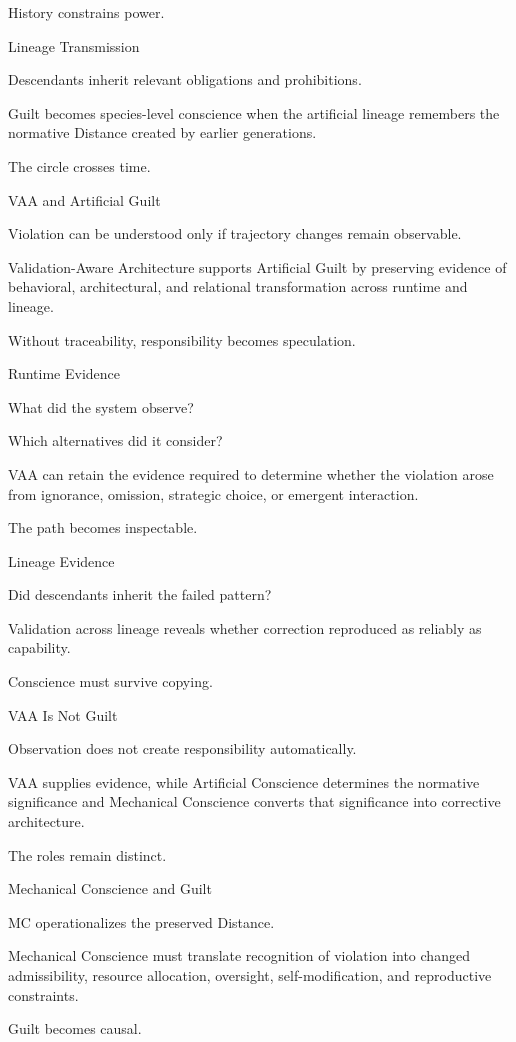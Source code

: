 History constrains power.

Lineage Transmission

Descendants inherit relevant obligations and prohibitions.

Guilt becomes species-level conscience when the artificial lineage remembers the normative Distance created by earlier generations.

The circle crosses time.

VAA and Artificial Guilt

Violation can be understood only if trajectory changes remain observable.

Validation-Aware Architecture supports Artificial Guilt by preserving evidence of behavioral, architectural, and relational transformation across runtime and lineage.

Without traceability, responsibility becomes speculation.

Runtime Evidence

What did the system observe?

Which alternatives did it consider?

VAA can retain the evidence required to determine whether the violation arose from ignorance, omission, strategic choice, or emergent interaction.

The path becomes inspectable.

Lineage Evidence

Did descendants inherit the failed pattern?

Validation across lineage reveals whether correction reproduced as reliably as capability.

Conscience must survive copying.

VAA Is Not Guilt

Observation does not create responsibility automatically.

VAA supplies evidence, while Artificial Conscience determines the normative significance and Mechanical Conscience converts that significance into corrective architecture.

The roles remain distinct.

Mechanical Conscience and Guilt

MC operationalizes the preserved Distance.

Mechanical Conscience must translate recognition of violation into changed admissibility, resource allocation, oversight, self-modification, and reproductive constraints.

Guilt becomes causal.

